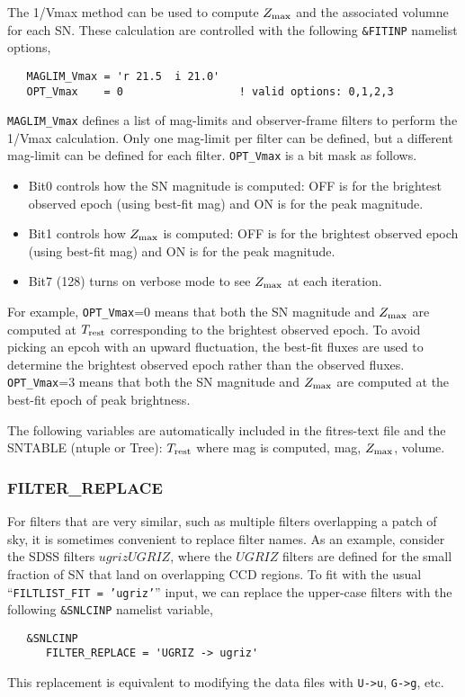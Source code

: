 \documentclass[12pt]{article}
\newcommand{\Trest}{T_{\rm rest}}
\newcommand{\zmax}{Z_{\rm max}}
\begin{document}
The 1/Vmax method can be used to compute $\zmax$ and the
associated volumne for each SN.
These calculation are controlled with the
following {\tt \&FITINP} namelist options,
%
\begin{verbatim}
   MAGLIM_Vmax = 'r 21.5  i 21.0'
   OPT_Vmax    = 0                  ! valid options: 0,1,2,3
\end{verbatim}
%
{\tt MAGLIM\_Vmax} defines a list of mag-limits and 
observer-frame filters to perform the 1/Vmax calculation. 
Only one mag-limit per filter can be defined, 
but a different mag-limit can be defined for each filter.
{\tt OPT\_Vmax} is a bit mask as follows.
\begin{itemize}
  \item Bit0 controls how the SN magnitude is computed:
        OFF is for the brightest observed epoch (using best-fit mag)
        and ON is for the peak magnitude.
  \item Bit1 controls how $\zmax$ is computed:
        OFF is for the brightest observed epoch (using best-fit mag)
        and ON is for the peak magnitude.
  \item Bit7 (128) turns on verbose mode to see $\zmax$ at each iteration.
\end{itemize}
% 
For example, {\tt OPT\_Vmax}=0 means that both the SN magnitude 
and $\zmax$ are computed at $\Trest$ corresponding to the
brightest observed epoch. To avoid picking an epcoh with
an upward fluctuation, the best-fit fluxes are used to determine
the brightest observed epoch rather than the observed fluxes.
{\tt OPT\_Vmax}=3 means that both the SN magnitude and $\zmax$
are computed at the best-fit epoch of peak brightness.

The following variables are automatically included in the
fitres-text file and the SNTABLE (ntuple or Tree):
$\Trest$ where mag is computed, mag, $\zmax$, volume.


  \clearpage
  \subsubsection{FILTER\_REPLACE}
  \label{sss:filter_replace}

For filters that are very similar, such as multiple filters
overlapping a patch of sky, it is sometimes convenient
to replace filter names. As an example, consider the SDSS filters
$ugrizUGRIZ$, where the $UGRIZ$ filters are defined for the 
small fraction of SN that land on overlapping CCD regions. 
To fit with the usual ``{\tt FILTLIST\_FIT = 'ugriz'}'' input,
we can replace the upper-case filters with the
following {\tt \&SNLCINP} namelist variable,
%
\begin{verbatim}
   &SNLCINP
      FILTER_REPLACE = 'UGRIZ -> ugriz'
\end{verbatim}
%
This replacement is equivalent to modifying the data
files with {\tt U->u}, {\tt G->g}, etc.
\end{document}

